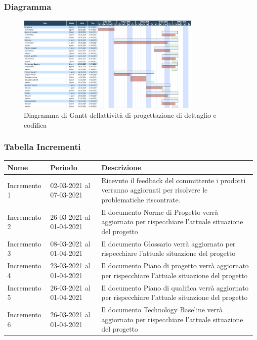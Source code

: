 	\subsubsection{Diagramma}
		\begin{figure}[H]
        		\centering
        		\includegraphics[width=0.8\textwidth]{source/img/Progettazionedettaglio_codifica.png}
        		\caption{Diagramma di Gantt dell\textquotesingle attività di progettazione di dettaglio e codifica}
    		\end{figure}
	\subsubsection{Tabella Incrementi}
		\begin{center}
    			\begin{tabular}{ | l | p{5cm} | p{8cm} |}
   			 \hline
    			Nome & Periodo & Descrizione \\ \hline
    			Incremento 1 & 02-03-2021 al 07-03-2021 & Ricevuto il feedback del committente i prodotti verranno aggiornati per risolvere le problematiche riscontrate. \\ \hline
    			Incremento 2 & 26-03-2021 al 01-04-2021 & Il documento Norme di Progetto verrà aggiornato per rispecchiare l'attuale situazione del progetto \\ \hline
    			Incremento 3 & 08-03-2021 al 01-04-2021 & Il documento Glossario verrà aggiornato per rispecchiare l'attuale situazione del progetto \\ \hline
			Incremento 4 & 23-03-2021 al 01-04-2021 & Il documento Piano di progetto verrà aggiornato per rispecchiare l'attuale situazione del progetto \\ \hline
			Incremento 5 & 26-03-2021 al 01-04-2021 & Il documento Piano di qualifica verrà aggiornato per rispecchiare l'attuale situazione del progetto \\ \hline
			Incremento 6 & 26-03-2021 al 01-04-2021 & Il documento Technology Baseline verrà aggiornato per rispecchiare l'attuale situazione del progetto \\ \hline
    			\end{tabular}
		\end{center}

